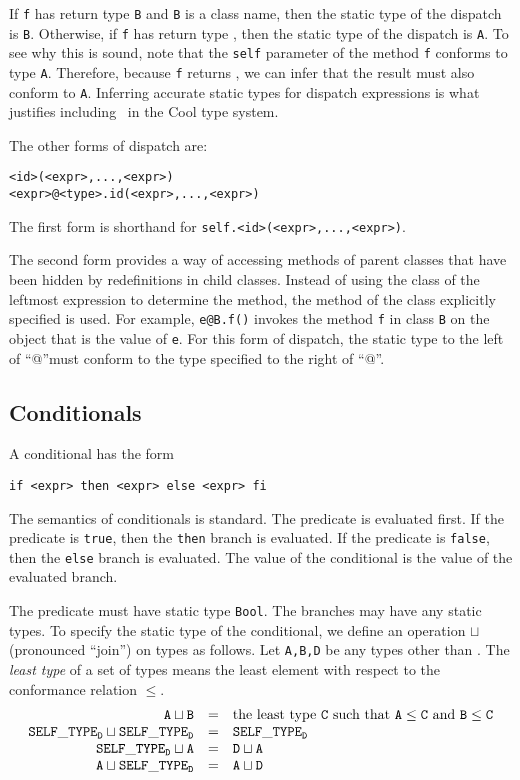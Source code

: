 If {\tt f} has return type {\tt B} and {\tt B} is a class name, then
the static type of the dispatch is {\tt B}.  Otherwise, if {\tt f} has
return type \styp, then the static type of the dispatch is {\tt A}. To see
why this is sound, note that the {\tt self} parameter of the method {\tt f}
conforms to type {\tt A}.  Therefore, because {\tt f} returns \styp,
we can infer that the result must also conform to {\tt A}.  Inferring
accurate static types for dispatch expressions is what justifies including
\styp\ in the Cool type system.


The other forms of dispatch are:
\begin{verbatim}
<id>(<expr>,...,<expr>)
<expr>@<type>.id(<expr>,...,<expr>)
\end{verbatim}
The first form is shorthand for {\tt self.<id>(<expr>,...,<expr>)}.

The second form  provides a way of accessing methods of parent classes 
that have been hidden by redefinitions in child classes.
Instead of using the class of the leftmost expression
to determine the method, the method of the class explicitly specified is
used.  For example, {\tt e@B.f()} invokes the method {\tt f} in
class {\tt B} on the object that is the value of {\tt e}.  For this form
of dispatch, the static type to the left of ``@''must conform to the
type specified to the right of ``@''.

\subsection{Conditionals}
\label{sec-cond}

A conditional has the form
\begin{verbatim}
if <expr> then <expr> else <expr> fi
\end{verbatim}

The semantics of conditionals is standard.  The predicate is evaluated
first.  If the predicate is {\tt true}, then the {\tt then} branch is
evaluated.  If the predicate is {\tt false}, then the {\tt else} branch is
evaluated.  The value of the conditional is the value of the evaluated branch.

The predicate must have static type {\tt Bool}.  The branches may have any static types.
To specify the static type of the conditional, we define an operation $\sqcup$
(pronounced ``join'') on types as follows.  Let {\tt A,B,D} be any types other than \styp.  The {\em least type} of a set of types means the least element
with respect to the conformance relation $\leq$.
\[
\begin{array}{rcl}
\tt A \sqcup B & = & \tt \m{\rm the least type\ } C \m{\rm \ such that\ }
	 A \leq C \m{\rm\ and } B \leq C \\
\tt \styp_D \sqcup \styp_D & = & \tt \styp_D \\
\tt \styp_D \sqcup A & = & \tt D \sqcup A \\
\tt A \sqcup \styp_D & = & \tt A \sqcup D 
\end{array}
\]

